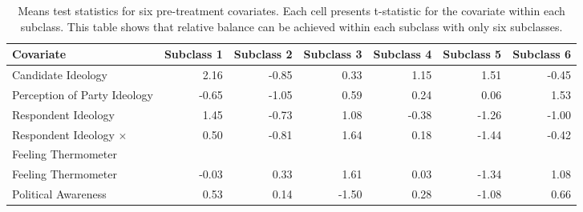 \documentclass[11pt,letterpaper]{article}
\theoremstyle{plain}
\begin{document}
\begin{table}[ht]
  \begin{center}
    \begin{tabular}{lrrrrrr}
      \hline
      Covariate & Subclass 1 & Subclass 2 & Subclass 3 & Subclass 4 & Subclass 5 & Subclass 6 \\
      \hline
      Candidate Ideology & 2.16 & -0.85 & 0.33 & 1.15 & 1.51 & -0.45 \\
      Perception of Party Ideology & -0.65 & -1.05 & 0.59 & 0.24 & 0.06 & 1.53 \\
      Respondent Ideology & 1.45 & -0.73 & 1.08 & -0.38 & -1.26 & -1.00 \\
      Respondent Ideology $\times$ & 0.50 & -0.81 & 1.64 & 0.18 &
      -1.44 & -0.42 \\
      Feeling Thermometer \\
      Feeling Thermometer & -0.03 & 0.33 & 1.61 & 0.03 & -1.34 & 1.08 \\
      Political Awareness & 0.53 & 0.14 & -1.50 & 0.28 & -1.08 & 0.66 \\
      \hline
    \end{tabular}
    \caption{Means test statistics for six pre-treatment covariates.
      Each cell presents t-statistic for the covariate within each
      subclass.  This table shows that relative balance can be
      achieved within each subclass with only six subclasses. }
    \label{tb:kochxsub}
  \end{center}
\end{table}
\end{document}
